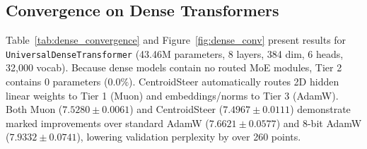 \documentclass[10pt,twocolumn,letterpaper]{article}
\begin{document}
\subsection{Convergence on Dense Transformers}

Table~\ref{tab:dense_convergence} and Figure~\ref{fig:dense_conv} present results for \texttt{UniversalDenseTransformer} (43.46M parameters, 8 layers, 384 dim, 6 heads, 32,000 vocab).
Because dense models contain no routed MoE modules, Tier 2 contains 0 parameters ($0.0\%$). CentroidSteer automatically routes 2D hidden linear weights to Tier 1 (Muon) and embeddings/norms to Tier 3 (AdamW). Both Muon ($7.5280 \pm 0.0061$) and CentroidSteer ($7.4967 \pm 0.0111$) demonstrate marked improvements over standard AdamW ($7.6621 \pm 0.0577$) and 8-bit AdamW ($7.9332 \pm 0.0741$), lowering validation perplexity by over 260 points.

\begin{table}[t]
\centering
\small
\caption{\textbf{Multi-Seed 100-Step Convergence on Dense Transformer (43.46M Parameters)} across 3 random seeds (Mean $\pm$ Std). All regimes evaluate identical bitwise initial weights.}
\label{tab:dense_convergence}
\end{table}
\end{document}
